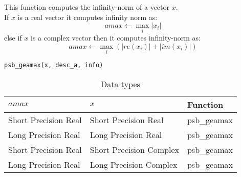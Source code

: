 This function computes 
 the infinity-norm of a vector $x$.\\
If $x$ is a real  vector
it computes infinity norm as:
\[ amax \leftarrow \max_i |x_i|\]
else if $x$ is a complex vector then it computes infinity-norm  as:
\[ amax \leftarrow \max_i {(|re(x_i)| + |im(x_i)|)}\]

\begin{verbatim}
psb_geamax(x, desc_a, info)
\end{verbatim}

\begin{table}[h]
\begin{center}
\begin{tabular}{lll}
\hline
$amax$ & $x$ & {\bf Function}\\
\hline
Short Precision Real& Short Precision Real & psb\_geamax \\
Long Precision Real&Long Precision Real & psb\_geamax \\
Short Precision Real&Short Precision Complex & psb\_geamax \\
Long Precision Real&Long Precision Complex & psb\_geamax \\
\hline
\end{tabular}
\end{center}
\caption{Data types\label{tab:f90amax}}
\end{table}


